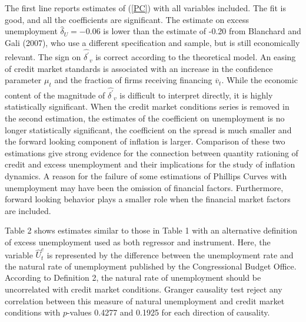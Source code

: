 \documentclass{article}
\begin{document}
The first line reports estimates of (\ref{PC}) with all variables included.
The fit is good, and all the coefficients are significant. The estimate
on excess unemployment $\widehat{\delta }_{U}=-0.06$ is lower than the
estimate of -0.20 from Blanchard and Gali (2007), who use a different
specification and sample, but is still economically relevant. The sign on $%
\widehat{\delta ^{\prime }}_{v}$ is correct according to the theoretical
model. An easing of credit market standards is associated with an increase
in the confidence parameter $\mu _{t}$ and the fraction of firms receiving
financing $\overline{v}_{t}$. While the economic content of the magnitude
of $\widehat{\delta ^{\prime }}_{v}$ is difficult to interpret directly, it
is highly statistically significant. When the credit market conditions
series is removed in the second estimation, the estimates of the coefficient
on unemployment is no longer statistically significant, the coefficient on
the spread is much smaller and the forward looking component of inflation is
larger. Comparison of these two estimations give strong evidence for the
connection between quantity rationing of credit and excess unemployment and
their implications for the study of inflation dynamics. A reason for the
failure of some estimations of Phillips Curves with unemployment may have
been the omission of financial factors. Furthermore, forward looking behavior
plays a smaller role when the financial market factors are included.

Table 2 shows estimates similar to those in Table 1 with an alternative
definition of excess unemployment used as both regressor and instrument.
Here, the variable $\widehat{U}_{t}^{c}$ is represented by the difference
between the unemployment rate and the natural rate of unemployment published
by the Congressional Budget Office. According to Definition 2, the natural
rate of unemployment should be uncorrelated with credit market conditions.
Granger causality test reject any correlation between this measure of
natural unemployment and credit market conditions with $p$-values 0.4277 and
0.1925 for each direction of causality.
\end{document}
